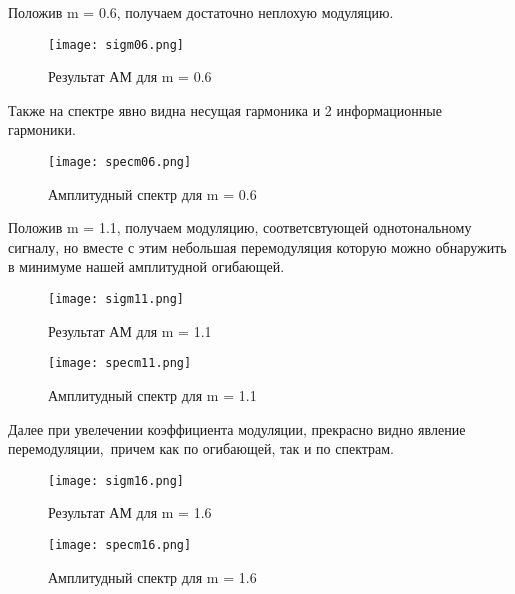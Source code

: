 Положив m = 0.6, получаем достаточно неплохую модуляцию. 
\begin{figure}[H]
	\begin{center}
		\texttt{[image: sigm06.png]}
		\caption{Результат АМ для m = 0.6} 
		\label{pic:pic01} %
	\end{center}
\end{figure} 
Также на спектре явно видна несущая гармоника и 2 информационные гармоники.
\begin{figure}[H]
	\begin{center}
		\texttt{[image: specm06.png]}
		\caption{Амплитудный спектр для m = 0.6} 
		\label{pic:pic02} %
	\end{center}
\end{figure} 
Положив m = 1.1, получаем модуляцию, соответсвтующей однотональному сигналу,
но вместе с этим небольшая перемодуляция которую можно обнаружить в минимуме нашей амплитудной огибающей. 
\begin{figure}[H]
	\begin{center}
		\texttt{[image: sigm11.png]}
		\caption{Результат АМ для m = 1.1} 
		\label{pic:pic01} %
	\end{center}
\end{figure} 

\begin{figure}[H]
	\begin{center}
		\texttt{[image: specm11.png]}
		\caption{Амплитудный спектр для m = 1.1} 
		\label{pic:pic02} %
	\end{center}
\end{figure}
Далее при увелечении коэффициента модуляции, прекрасно видно явление перемодуляции,\
причем как по огибающей, так и по спектрам.  
\begin{figure}[H]
	\begin{center}
		\texttt{[image: sigm16.png]}
		\caption{Результат АМ для m = 1.6} 
		\label{pic:pic01} %
	\end{center}
\end{figure} 

\begin{figure}[H]
	\begin{center}
		\texttt{[image: specm16.png]}
		\caption{Амплитудный спектр для m = 1.6} 
		\label{pic:pic02} %
	\end{center}
\end{figure}
  

